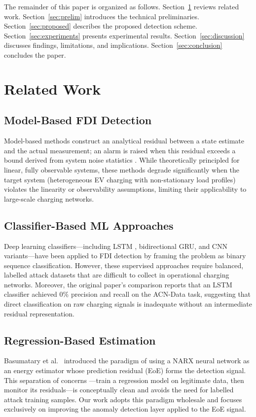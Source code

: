 \documentclass[journal]{IEEEtran}
\begin{document}
The remainder of this paper is organized as follows. Section~\ref{sec:related}
reviews related work. Section~\ref{sec:prelim} introduces the technical
preliminaries. Section~\ref{sec:proposed} describes the proposed
detection scheme. Section~\ref{sec:experiments} presents experimental
results. Section~\ref{sec:discussion} discusses findings, limitations,
and implications. Section~\ref{sec:conclusion} concludes the paper.

\section{Related Work}
\label{sec:related}

\subsection{Model-Based FDI Detection}
Model-based methods construct an analytical residual between a state
estimate and the actual measurement; an alarm is raised when this
residual exceeds a bound derived from system noise statistics
\cite{musleh2020}. While theoretically principled for linear, fully
observable systems, these methods degrade significantly when the target
system (heterogeneous EV charging with non-stationary load profiles)
violates the linearity or observability assumptions, limiting their
applicability to large-scale charging networks.

\subsection{Classifier-Based ML Approaches}
Deep learning classifiers---including LSTM \cite{guo2021},
bidirectional GRU, and CNN variants---have been applied to FDI
detection by framing the problem as binary sequence classification.
However, these supervised approaches require balanced, labelled attack
datasets that are difficult to collect in operational charging networks.
Moreover, the original paper's comparison \cite{basumatary2025} reports
that an LSTM classifier achieved 0\% precision and recall on the
ACN-Data task, suggesting that direct classification on raw charging
signals is inadequate without an intermediate residual representation.

\subsection{Regression-Based Estimation}
Basumatary et al.\ \cite{basumatary2025} introduced the paradigm of
using a NARX neural network as an energy estimator whose prediction
residual (EoE) forms the detection signal. This separation of concerns
---train a regression model on legitimate data, then monitor its
residuals---is conceptually clean and avoids the need for labelled
attack training samples. Our work adopts this paradigm wholesale and
focuses exclusively on improving the anomaly detection layer applied to
the EoE signal.
\end{document}
